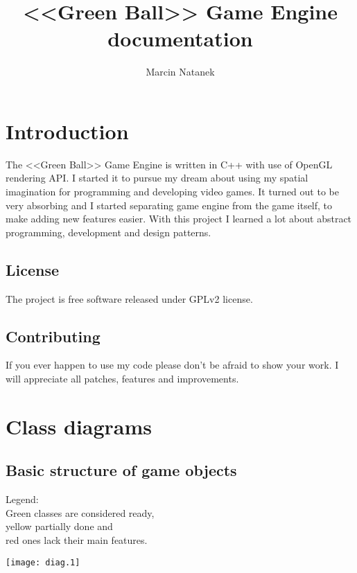 \documentclass[11pt,a4paper,oneside]{report}
\title{<<Green Ball>> Game Engine documentation}
\author{Marcin Natanek}
\begin{document}
\maketitle
\pagebreak
\tableofcontents
\pagebreak

\chapter{Introduction}
The <<Green Ball>> Game Engine is written in C++ with use of OpenGL rendering API. I started it to pursue my dream about using my spatial imagination for programming and developing video games. It turned out to be very absorbing and I started separating game engine from the game itself, to make adding new features easier. With this project I learned a lot about abstract programming, development and design patterns.

\section{License}
The project is free software released under GPLv2 license.

\section{Contributing}
If you ever happen to use my code please don't be afraid to show your work. I will appreciate all patches, features and improvements.

\chapter{Class diagrams}
\section{Basic structure of game objects}
Legend:
\\\colorbox{gr}{Green} classes are considered ready, 
\\\colorbox{ye}{yellow} partially done and 
\\\colorbox{re}{red} ones lack their main features.

\texttt{[image: diag.1]}
\end{document}
